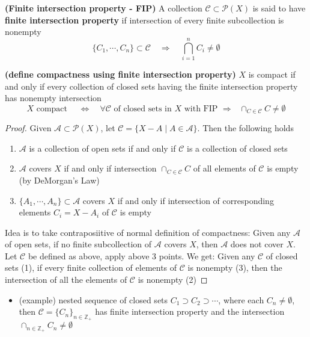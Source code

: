 \documentclass[10.5pt]{article}
\newcommand{\Z}{\mathbb{Z}}
\newcommand{\calA}{\mathcal{A}}
\newcommand{\calC}{\mathcal{C}}
\newcommand{\calP}{\mathcal{P}}
\begin{document}
\begin{defn*}
    \textbf{(Finite intersection property - FIP)} A collection $\calC \subset\calP(X)$ is said to have \textbf{finite intersection property} if intersection of every finite subcollection is nonempty
    \[
        \{C_1,\cdots,C_n\} \subset \calC \quad \Rightarrow \quad \bigcap_{i=1}^n C_i \neq \emptyset
    \]
\end{defn*}

\begin{theorem*}
    \textbf{(define compactness using finite intersection property)} $X$ is compact if and only if every collection of closed sets having the finite intersection property has nonempty intersection
    \[
        X \text{ compact } 
        \quad \iff \quad
        \text{$\forall \calC$ of closed sets in $X$ with FIP $\Rightarrow$ $\cap_{C\in\calC} C \neq \emptyset$}
    \]
    \begin{proof}
        Given $\calA \subset\calP(X)$, let $\calC = \{X - A \mid A\in \calA\}$. Then the following holds
        \begin{enumerate}
            \item $\calA$ is a collection of open sets if and only if $\calC$ is a collection of closed sets
            \item $\calA$ covers $X$ if and only if intersection $\textstyle \cap_{C\in \calC} C$ of all elements of $\calC$ is empty (by DeMorgan's Law)
            \item $\{A_1, \cdots, A_n\} \subset \calA$ covers $X$ if and only if intersection of corresponding elements $C_i = X-A_i$ of $\calC$ is empty
        \end{enumerate}
        Idea is to take contraposiitive of normal definition of compactness: Given any $\calA$ of open sets, if no finite subcollection of $\calA$ covers $X$, then $\calA$ does not cover $X$. Let $\calC$ be defined as above, apply above 3 points. We get: Given any $\calC$ of closed sets (1), if every finite collection of elements of $\calC$ is nonempty (3), then the intersection of all the elements of $\calC$ is nonempty (2)
    \end{proof}
    \begin{itemize}
        \item (example) nested sequence of closed sets $C_1 \supset C_2 \supset \cdots$, where each $C_n \neq \emptyset$, then $\calC = \{C_n\}_{n\in \Z_+}$ has finite intersection property and the intersection $\cap_{n\in\Z_+} C_n \neq \emptyset$
    \end{itemize}
\end{theorem*}
\end{document}
